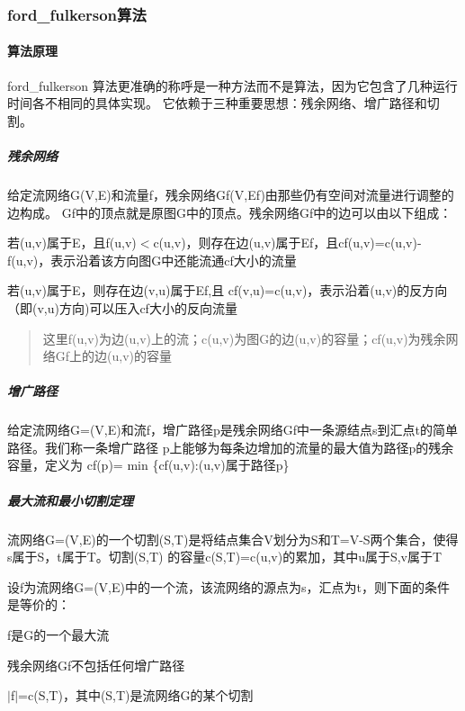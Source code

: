 \subsubsection*{ford\+\_\+fulkerson算法}

\paragraph*{算法原理}

ford\+\_\+fulkerson 算法更准确的称呼是一种方法而不是算法，因为它包含了几种运行时间各不相同的具体实现。 它依赖于三种重要思想：残余网络、增广路径和切割。

\subparagraph*{残余网络}

给定流网络\+G(\+V,\+E)和流量f，残余网络\+Gf(\+V,\+Ef)由那些仍有空间对流量进行调整的边构成。 Gf中的顶点就是原图\+G中的顶点。残余网络\+Gf中的边可以由以下组成：


\begin{DoxyItemize}
\item 若(u,v)属于\+E，且f(u,v)$<$c(u,v)，则存在边(u,v)属于\+Ef，且cf(u,v)=c(u,v)-\/f(u,v)，表示沿着该方向图\+G中还能流通cf大小的流量
\item 若(u,v)属于\+E，则存在边(v,u)属于\+Ef,且 cf(v,u)=c(u,v)，表示沿着(u,v)的反方向（即(v,u)方向)可以压入cf大小的反向流量 \begin{quote}
这里f(u,v)为边(u,v)上的流；c(u,v)为图\+G的边(u,v)的容量；cf(u,v)为残余网络\+Gf上的边(u,v)的容量 \end{quote}

\end{DoxyItemize}

\subparagraph*{增广路径}

给定流网络\+G=(V,E)和流f，增广路径p是残余网络\+Gf中一条源结点s到汇点t的简单路径。我们称一条增广路径 p上能够为每条边增加的流量的最大值为路径p的残余容量，定义为 cf(p)= min \{cf(u,v)\+:(u,v)属于路径p\}

\subparagraph*{最大流和最小切割定理}

流网络\+G=(V,E)的一个切割(\+S,\+T)是将结点集合\+V划分为\+S和\+T=V-\/\+S两个集合，使得s属于\+S，t属于\+T。切割(S,T) 的容量c(\+S,\+T)=c(u,v)的累加，其中u属于\+S,v属于\+T

设f为流网络\+G=(V,E)中的一个流，该流网络的源点为s，汇点为t，则下面的条件是等价的：


\begin{DoxyItemize}
\item f是\+G的一个最大流
\item 残余网络\+Gf不包括任何增广路径
\item $\vert$f$\vert$=c(\+S,\+T)，其中(\+S,\+T)是流网络\+G的某个切割
\end{DoxyItemize}

